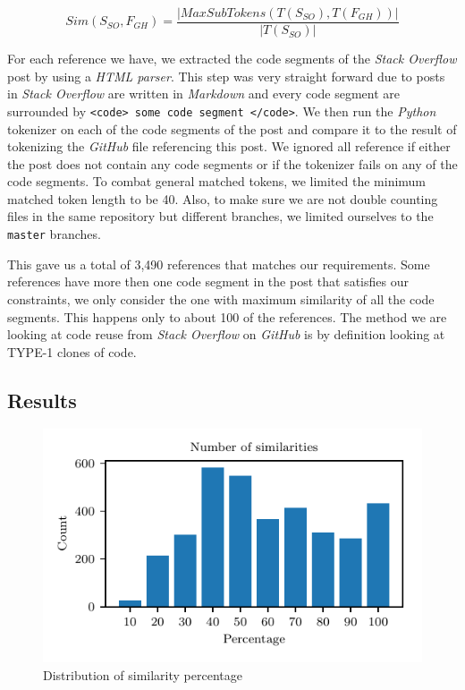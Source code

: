 \documentclass[sigconf]{acmart}
\begin{document}
$$
Sim(S_{SO}, F_{GH}) = \frac{|MaxSubTokens(T(S_{SO}), T(F_{GH}))|}{|T(S_{SO})|}
$$

For each reference we have, we extracted the code segments of the \textit{Stack Overflow} post by using a \textit{HTML parser}. This step was very straight forward due to posts in \textit{Stack Overflow} are written in \textit{Markdown} and every code segment are surrounded by \texttt{<code> some code segment </code>}. We then run the \textit{Python} tokenizer on each of the code segments of the post and compare it to the result of tokenizing the \textit{GitHub} file referencing this post. We ignored all reference if either the post does not contain any code segments or if the tokenizer fails on any of the code segments. To combat general matched tokens, we limited the minimum matched token length to be 40. Also, to make sure we are not double counting files in the same repository but different branches, we limited ourselves to the \texttt{master} branches.

This gave us a total of 3,490 references that matches our requirements. Some references have more then one code segment in the post that satisfies our constraints, we only consider the one with maximum similarity of all the code segments. This happens only to about 100 of the references. The method we are looking at code reuse from \textit{Stack Overflow} on \textit{GitHub} is by definition looking at \textsc{TYPE-1} clones of code. 

\subsection{Results}

\begin{figure}[h]
\centering
\includegraphics[width=\linewidth]{Figure_2.pdf}
\caption{Distribution of similarity percentage}
\label{fig:dis_sim}
\end{figure}
\end{document}
